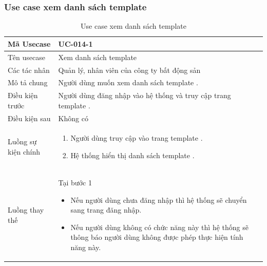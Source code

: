 \documentclass[12pt,a4paper]{article}
\begin{document}
    \subsubsection*{Use case xem danh sách template  }
    \begin{table}[H]
        \centering
        \begin{tabular}{|p{3.5cm}|p{11.5cm}|c|}
            \hline
            Mã Usecase      & UC-014-1                                                       \\
            \hline
            Tên usecase     & Xem danh sách template                                         \\
            \hline
            Các tác nhân    & Quản lý, nhân viên của công ty bất động sản                    \\
            \hline
            Mô tả chung     & Người dùng muốn xem danh sách template .                       \\
            \hline

            Điều kiện trước & Người dùng đăng nhập vào hệ thống và truy cập trang template . \\
            \hline

            Điều kiện sau   & Không có                                                       \\
            \hline

            Luồng sự kiện chính & \vspace{-.8cm}\begin{enumerate}
                                                    \item Người dùng truy cập vào trang template .
                                                    \item Hệ thống hiển thị danh sách template .
            \end{enumerate}
            \\
            \hline
            Luồng thay thế & Tại bước 1\newline
            \vspace{-.8cm}\begin{itemize}
                              \item Nếu người dùng chưa đăng nhập thì hệ thống sẽ chuyển sang trang đăng nhập.
                              \item  Nếu người dùng không có chức năng này thì hệ thống sẽ thông báo người dùng không được phép thực hiện tính năng này.
            \end{itemize}

            \\    \hline
        \end{tabular}
        \caption{Use case xem danh sách template  }
    \end{table}
\end{document}
